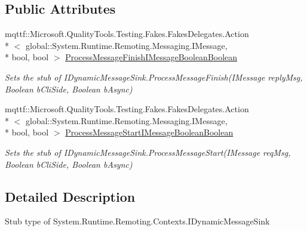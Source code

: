 \subsection*{Public Attributes}
\begin{DoxyCompactItemize}
\item 
mqttf\-::\-Microsoft.\-Quality\-Tools.\-Testing.\-Fakes.\-Fakes\-Delegates.\-Action\\*
$<$ global\-::\-System.\-Runtime.\-Remoting.\-Messaging.\-I\-Message, \\*
bool, bool $>$ \hyperlink{class_system_1_1_runtime_1_1_remoting_1_1_contexts_1_1_fakes_1_1_stub_i_dynamic_message_sink_a06da6edaec8621edfd6fde49ad38520b}{Process\-Message\-Finish\-I\-Message\-Boolean\-Boolean}
\begin{DoxyCompactList}\small\item\em Sets the stub of I\-Dynamic\-Message\-Sink.\-Process\-Message\-Finish(\-I\-Message reply\-Msg, Boolean b\-Cli\-Side, Boolean b\-Async)\end{DoxyCompactList}\item 
mqttf\-::\-Microsoft.\-Quality\-Tools.\-Testing.\-Fakes.\-Fakes\-Delegates.\-Action\\*
$<$ global\-::\-System.\-Runtime.\-Remoting.\-Messaging.\-I\-Message, \\*
bool, bool $>$ \hyperlink{class_system_1_1_runtime_1_1_remoting_1_1_contexts_1_1_fakes_1_1_stub_i_dynamic_message_sink_a78dd3a17919c117902bc47dde4552ead}{Process\-Message\-Start\-I\-Message\-Boolean\-Boolean}
\begin{DoxyCompactList}\small\item\em Sets the stub of I\-Dynamic\-Message\-Sink.\-Process\-Message\-Start(\-I\-Message req\-Msg, Boolean b\-Cli\-Side, Boolean b\-Async)\end{DoxyCompactList}\end{DoxyCompactItemize}


\subsection{Detailed Description}
Stub type of System.\-Runtime.\-Remoting.\-Contexts.\-I\-Dynamic\-Message\-Sink



